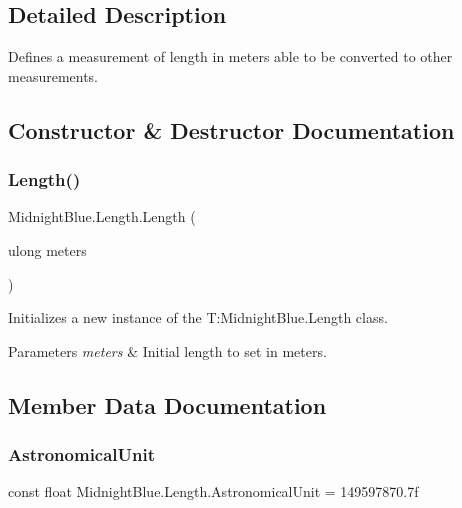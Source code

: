 \subsection{Detailed Description}
Defines a measurement of length in meters able to be converted to other measurements. 



\subsection{Constructor \& Destructor Documentation}
\hypertarget{class_midnight_blue_1_1_length_a8c58b161c6f730c22d84b01b078bd091}{}\label{class_midnight_blue_1_1_length_a8c58b161c6f730c22d84b01b078bd091} 
\subsubsection{\texorpdfstring{Length()}{Length()}}
{\footnotesize\ttfamily Midnight\+Blue.\+Length.\+Length (\begin{DoxyParamCaption}\item[{ulong}]{meters }\end{DoxyParamCaption})\hspace{0.3cm}{\ttfamily [inline]}}



Initializes a new instance of the T\+:\+Midnight\+Blue.\+Length class. 


\begin{DoxyParams}{Parameters}
{\em meters} & Initial length to set in meters.\\
\hline
\end{DoxyParams}


\subsection{Member Data Documentation}
\hypertarget{class_midnight_blue_1_1_length_a5e86fa7e1d296ca9e6c5406a863427a6}{}\label{class_midnight_blue_1_1_length_a5e86fa7e1d296ca9e6c5406a863427a6} 
\subsubsection{\texorpdfstring{Astronomical\+Unit}{AstronomicalUnit}}
{\footnotesize\ttfamily const float Midnight\+Blue.\+Length.\+Astronomical\+Unit = 149597870.\+7f}



